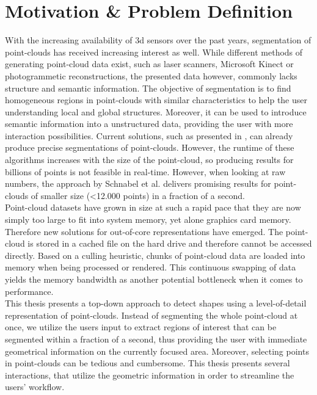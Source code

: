 \section{Motivation \& Problem Definition}

With the increasing availability of 3d sensors over the past years, segmentation of point-clouds has received increasing interest as well. While different methods of generating point-cloud data exist, such as laser scanners, Microsoft Kinect or photogrammetic reconstructions, the presented data however, commonly lacks structure and semantic information. The objective of segmentation is to find homogeneous regions in point-clouds with similar characteristics to help the user understanding local and global structures. Moreover, it can be used to introduce semantic information into a unstructured data, providing the user with more interaction possibilities. Current solutions, such as presented in \cite{schnabel-2007-efficient}, \cite{schnabel-2007-ransac} can already produce precise segmentations of point-clouds. However, the runtime of these algorithms increases with the size of the point-cloud, so producing results for billions of points is not feasible in real-time. However, when looking at raw numbers, the approach by Schnabel et al. \cite{schnabel-2007-ransac} delivers promising results for point-clouds of smaller size (\textless 12.000 points) in a fraction of a second. 
\\
Point-cloud datasets have grown in size at such a rapid pace that they are now simply too large to fit into system memory, yet alone graphics card memory. Therefore new solutions for out-of-core representations have emerged. The point-cloud is stored in a cached file on the hard drive and therefore cannot be accessed directly. Based on a culling heuristic, chunks of point-cloud data are loaded into memory when being processed or rendered. This continuous swapping of data yields the memory bandwidth as another potential bottleneck when it comes to performance.
\\

This thesis presents a top-down approach to detect shapes using a level-of-detail representation of point-clouds. Instead of segmenting the whole point-cloud at once, we utilize the users input to extract regions of interest that can be segmented within a fraction of a second, thus providing the user with immediate geometrical information on the currently focused area. Moreover, selecting points in point-clouds can be tedious and cumbersome. This thesis presents several interactions, that utilize the geometric information in order to streamline the users' workflow. 